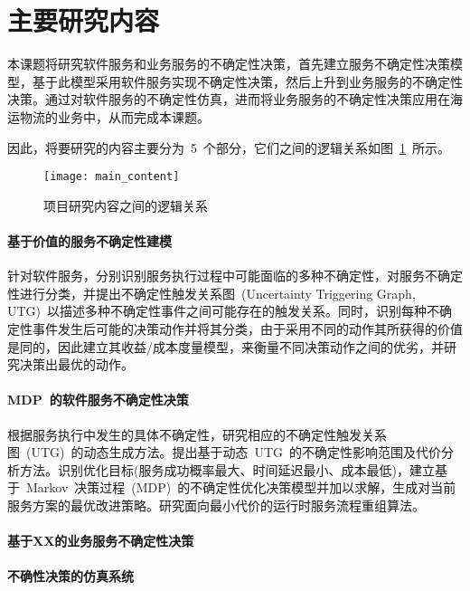 \section{主要研究内容}

本课题将研究软件服务和业务服务的不确定性决策，首先建立服务不确定性决策模型，基于此模型采用软件服务实现不确定性决策，然后上升到业务服务的不确定性决策。通过对软件服务的不确定性仿真，进而将业务服务的不确定性决策应用在海运物流的业务中，从而完成本课题。

因此，将要研究的内容主要分为~5~个部分，它们之间的逻辑关系如图~\ref{main_content}~所示。

\begin{figure}[htbp]
    \centering
    \texttt{[image: main\_content]}
    \caption{项目研究内容之间的逻辑关系}\label{main_content}
    \vspace{-1em}
\end{figure}

\setcounter{paragraph}{0}

\paragraph{基于价值的服务不确定性建模}

针对软件服务，分别识别服务执行过程中可能面临的多种不确定性，对服务不确定性进行分类，并提出不确定性触发关系图~(Uncertainty Triggering Graph, UTG)~以描述多种不确定性事件之间可能存在的触发关系。同时，识别每种不确定性事件发生后可能的决策动作并将其分类，由于采用不同的动作其所获得的价值是同的，因此建立其收益/成本度量模型，来衡量不同决策动作之间的优劣，并研究决策出最优的动作。

\paragraph{MDP~的软件服务不确定性决策}

根据服务执行中发生的具体不确定性，研究相应的不确定性触发关系图~(UTG)~的动态生成方法。提出基于动态~UTG~的不确定性影响范围及代价分析方法。识别优化目标(服务成功概率最大、时间延迟最小、成本最低)，建立基于~Markov~决策过程~(MDP)~的不确定性优化决策模型并加以求解，生成对当前服务方案的最优改进策略。研究面向最小代价的运行时服务流程重组算法。

\paragraph{基于XX的业务服务不确定性决策}


\paragraph{不确性决策的仿真系统}

